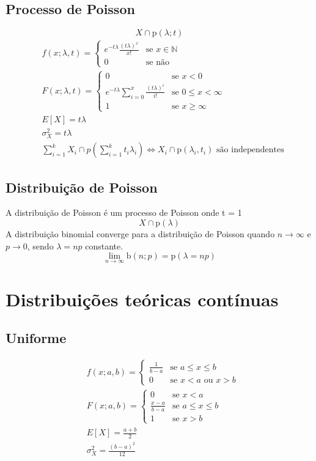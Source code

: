 \documentclass[a4paper]{article}
\begin{document}
\begin{multicols}{3}
\subsection{Processo de Poisson}
$$X \cap \text{p}(\lambda; t)$$
\begin{align*}
  &f(x; \lambda, t) = \begin{cases}
    e^{-t\lambda}\frac{(t\lambda)^x}{x!} & \text{se } x \in \mathbb{N} \\
    0 & \text{se não}
  \end{cases} \\
  &F(x; \lambda, t) = \begin{cases}
    0 & \text{se } x < 0 \\
    e^{-t\lambda} \sum\limits_{i=0}^x \frac{(t\lambda)^i}{i!} & \text{se } 0 \leq x < \infty \\
    1 & \text{se } x \geq \infty
  \end{cases} \\
  &E[X] = t\lambda \\
  &\sigma^2_X = t\lambda \\
  &\sum_{i=1}^k X_i \cap p\left(\sum^k_{i=1} t_i\lambda_i\right) \iff X_i \cap \text{p}(\lambda_i, t_i) \text{ são independentes}
\end{align*}
\subsection{Distribuição de Poisson}
A distribuição de Poisson é um processo de Poisson onde t = 1
$$X \cap \text{p}(\lambda)$$
A distribuição binomial converge para a distribuição de Poisson quando $n \to \infty$ e $p \to 0$, sendo $\lambda = np$ constante.
$$\lim_{n \to \infty} \text{b}(n; p)= \text{p}(\lambda = np)$$
\section{Distribuições teóricas contínuas}
\subsection{Uniforme}
\begin{align*}
  &f(x; a, b) = \begin{cases}
    \frac{1}{b - a} & \text{se } a \leq x \leq b \\
    0 & \text{se } x < a \text{ ou } x > b
  \end{cases} \\
  &F(x; a, b) = \begin{cases}
    0 & \text{se } x < a \\
    \frac{x - a}{b - a} & \text{se } a \leq x \leq b \\
    1 & \text{se } x > b
  \end{cases} \\
  &E[X] = \frac{a + b}{2} \\
  &\sigma^2_X = \frac{(b - a)^2}{12}
\end{align*}

\end{multicols}
\end{document}
